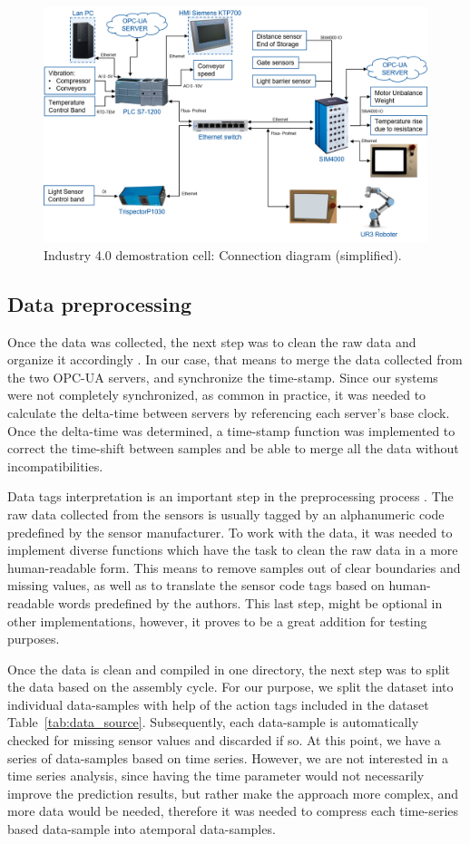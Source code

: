 \documentclass[5p,times,procedia]{elsarticle}
\begin{document}
\begin{figure}
       \includegraphics[width=.45\textwidth]{img/demozelle_conex_diagram.png}
       \caption{Industry 4.0 demostration cell: Connection diagram (simplified).
             }
\label{fig:demo_conn_diag}
\end{figure}

\subsection{Data preprocessing}

Once the data was collected, the next step was to clean the raw data and organize it accordingly \cite{goodfellow2016deep}. In our case, that means to merge the data collected from the two OPC-UA servers, and synchronize the time-stamp. Since our systems were not completely synchronized, as common in practice, it was needed to calculate the delta-time between servers by referencing each server's base clock. Once the delta-time was determined, a time-stamp function was implemented to correct the time-shift between samples and be able to merge all the data without incompatibilities.

Data tags interpretation is an important step in the preprocessing process \cite{goodfellow2016deep}. The raw data collected from the sensors is usually tagged by an alphanumeric code predefined by the sensor manufacturer. To work with the data, it was needed to implement diverse functions which have the task to clean the raw data in a more human-readable form. This means to remove samples out of clear boundaries and missing values, as well as to translate the sensor code tags based on human-readable words predefined by the authors. This last step, might be optional in other implementations, however, it proves to be a great addition for testing purposes.

Once the data is clean and compiled in one directory, the next step was to split the data based on the assembly cycle. For our purpose, we split the dataset into individual data-samples with help of the action tags included in the dataset Table~\ref{tab:data_source}. Subsequently, each data-sample is automatically checked for missing sensor values and discarded if so. At this point, we have a series of data-samples based on time series. However, we are not interested in a time series analysis, since having the time parameter would not necessarily improve the prediction results, but rather make the approach more complex, and more data would be needed, therefore it was needed to compress each time-series based data-sample into atemporal data-samples.
\end{document}
